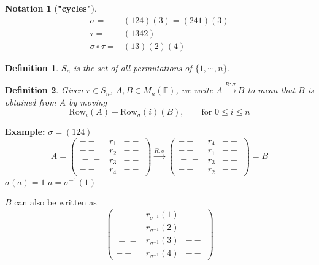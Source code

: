\documentclass[12pt]{article}
\newtheorem{definition}{Definition}[subsection]
\newtheorem{notation}{Notation}[subsection]
\newcommand{\Row}{\mathrm{Row}}
\newcommand{\mF}{{\mathbb{F}}}
\begin{document}
\begin{notation}[\textbf{"cycles"}]
	\begin{align*}
		\sigma =& (1 2 4)(3) = (2 4 1)(3) \\
		\tau =& (1 3 4 2)\\
		\sigma \circ \tau =& (1 3)(2)(4)
	\end{align*}
\end{notation}

\begin{definition}
	$S_n$ is the set of all permutations of $\{1, \cdots, n\}$. 
\end{definition}

\begin{definition}
	Given $r \in S_n$, $A, B \in M_n(\mF)$, we write
	$A \overset{R:\sigma}{\longrightarrow} B$ to mean that $B$ is obtained from
	$A$ by moving 
	\[
		\Row_i(A) + \Row_{\sigma} (i)(B), \qquad \text{for } 0 \leq i \leq n
	\]
\end{definition}

{\color{Brown}
	\textbf{Example: }
	$\sigma = (1 2 4)$
	\[
		A = 
		\begin{pmatrix}
			-- & r_1 & -- \\
			-- & r_2 & -- \\
			== & r_3 & -- \\
			-- & r_4 & -- 
		\end{pmatrix}
		\overset{R: \sigma}{\longrightarrow} 
		\begin{pmatrix}
			-- & r_4 & -- \\
			-- & r_1 & -- \\
			== & r_3 & -- \\
			-- & r_2 & -- 
		\end{pmatrix}
		=B
	\]
	$\sigma(a)=1$ $a = \sigma^{-1}(1)$

	$B$ can also be written as 
	\[
		\begin{pmatrix}
			-- & r_{\sigma^{-1}}(1) & -- \\
			-- & r_{\sigma^{-1}}(2) & -- \\
			== & r_{\sigma^{-1}}(3) & -- \\
			-- & r_{\sigma^{-1}}(4) & -- 
		\end{pmatrix}
	\]
}
\end{document}
